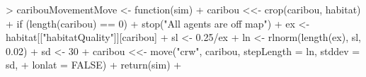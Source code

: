 \documentclass{article}
\begin{document}
\begin{Schunk}
\begin{Soutput}
> caribouMovementMove <- function(sim) {
+     caribou <<- crop(caribou, habitat)
+     if (length(caribou) == 0) 
+         stop("All agents are off map")
+     ex <- habitat[["habitatQuality"]][caribou]
+     sl <- 0.25/ex
+     ln <- rlnorm(length(ex), sl, 0.02)
+     sd <- 30
+     caribou <<- move("crw", caribou, stepLength = ln, stddev = sd, 
+         lonlat = FALSE)
+     return(sim)
+ }
\end{Soutput}
\end{Schunk}
\end{document}
